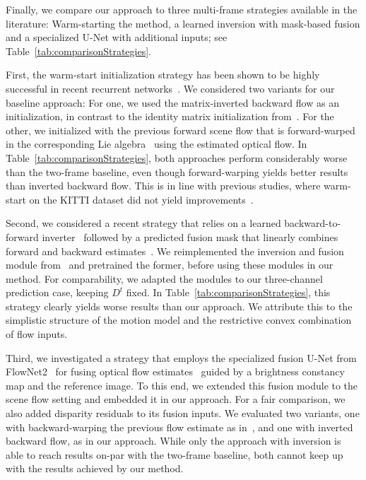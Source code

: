 \documentclass[10pt,twocolumn,letterpaper]{article}
\begin{document}
Finally, we compare our approach to three multi-frame strategies available in the literature:
Warm-starting the method, a learned inversion with mask-based fusion and a specialized U-Net with additional inputs; see Table~\ref{tab:comparisonStrategies}.

First, the warm-start initialization strategy has been shown to be highly successful in recent recurrent networks~\cite{Teed2020_RAFT}.
We considered two variants for our baseline approach:
For one, we used the matrix-inverted backward flow as an initialization, in contrast to the identity matrix initialization from~\cite{Teed2021_RAFT3D}.
For the other, we initialized with the previous forward scene flow that is forward-warped in the corresponding Lie algebra~\cite{Teed2021_Lie} using the estimated optical flow.
In Table~\ref{tab:comparisonStrategies}, both approaches perform considerably worse than the two-frame baseline,
even though forward-warping yields better results than inverted backward flow.
This is in line with previous studies, where warm-start on the KITTI dataset did not yield improvements~\cite{Teed2020_RAFT}.



Second, we considered a recent strategy that relies on a learned backward-to-forward inverter~\cite{Maurer2018_ProFlow,Schuster2021_DTF} followed by a predicted fusion mask that linearly combines forward and backward estimates~\cite{Schuster2021_DTF}.
We reimplemented the inversion and fusion module from~\cite{Schuster2021_DTF} and pretrained the former, before using these modules in our method.
For comparability, we adapted the modules to our three-channel prediction case, keeping $D^t$ fixed.
In Table~\ref{tab:comparisonStrategies}, this strategy clearly yields worse results than our approach.
We attribute this to the simplistic structure of the motion model and the restrictive convex combination of flow inputs.



Third, we investigated a strategy that employs the specialized fusion U-Net from FlowNet2~\cite{Ilg2017_Flownet2} for fusing optical flow estimates~\cite{Ren2019_FlowTemporalFusion} guided by a brightness constancy map and the reference image.
To this end, we extended this fusion module to the scene flow setting and embedded it in our approach.
For a fair comparison, we also added disparity residuals to its fusion inputs.
We evaluated two variants, one with backward-warping the previous flow estimate as in~\cite{Ren2019_FlowTemporalFusion}, and one with inverted backward flow, as in our approach.
While only the approach with inversion is able to reach results on-par with the two-frame baseline, both cannot keep up with the results achieved by our method.
\end{document}
